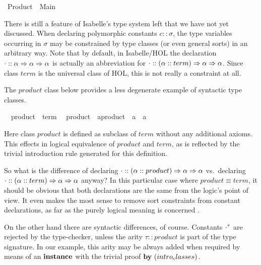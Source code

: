 \begin{isabelle}%
%
\ Product\ {\isacharequal}\ Main{\isacharcolon}%
\begin{isamarkuptext}%
\medskip\noindent There is still a feature of Isabelle's type system
 left that we have not yet discussed.  When declaring polymorphic
 constants $c :: \sigma$, the type variables occurring in $\sigma$ may
 be constrained by type classes (or even general sorts) in an
 arbitrary way.  Note that by default, in Isabelle/HOL the declaration
 $\cdot :: \alpha \Rightarrow \alpha \Rightarrow \alpha$ is actually an abbreviation
 for $\cdot :: (\alpha::term) \Rightarrow \alpha \Rightarrow \alpha$.  Since class
 $term$ is the universal class of HOL, this is not really a constraint
 at all.

 The $product$ class below provides a less degenerate example of
 syntactic type classes.%
\end{isamarkuptext}%
\isanewline
\ \ product\ {\isacharless}\ {\isachardoublequote}term{\isachardoublequote}\isanewline
{}\isanewline
\ \ product\ {\isacharcolon}{\isacharcolon}\ {\isachardoublequote}{\isacharprime}a{\isacharcolon}{\isacharcolon}product\ {\isasymRightarrow}\ {\isacharprime}a\ {\isasymRightarrow}\ {\isacharprime}a{\isachardoublequote}\ \ \ \ {\isacharparenleft}\ {\isachardoublequote}{\isasymOtimes}{\isachardoublequote}\ %
\begin{isamarkuptext}%
Here class $product$ is defined as subclass of $term$ without any
 additional axioms.  This effects in logical equivalence of $product$
 and $term$, as is reflected by the trivial introduction rule
 generated for this definition.

 \medskip So what is the difference of declaring $\cdot :: (\alpha ::
 product) \Rightarrow \alpha \Rightarrow \alpha$ vs.\ declaring $\cdot :: (\alpha ::
 term) \Rightarrow \alpha \Rightarrow \alpha$ anyway?  In this particular case where
 $product \equiv term$, it should be obvious that both declarations
 are the same from the logic's point of view.  It even makes the most
 sense to remove sort constraints from constant declarations, as far
 as the purely logical meaning is concerned \cite{Wenzel:1997:TPHOL}.

 On the other hand there are syntactic differences, of course.
 Constants $\cdot^\tau$ are rejected by the type-checker, unless the
 arity $\tau :: product$ is part of the type signature.  In our
 example, this arity may be always added when required by means of an
 ${\mathord{\mathbf{instance}}}$ with the trivial proof $\BY{intro_classes}$.


\end{isamarkuptext}
\end{isabelle}
